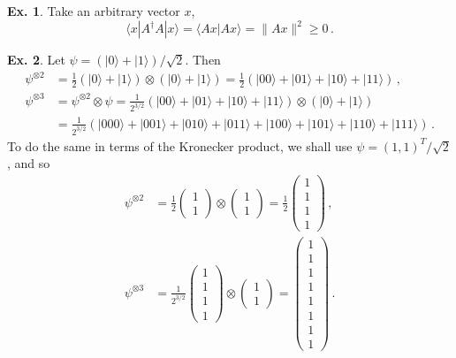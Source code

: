 \documentclass[a4paper,12pt]{article}
\theoremstyle{definition}
\newtheorem{exercise}{Ex.}[section]
\begin{document}
\begin{exercise} Take an arbitrary vector $x$,
 \[
  \langle x | A^\dagger A | x \rangle = \langle A x|A x\rangle = \|A x\|^2 \ge 0\,.
 \]
\end{exercise}

\begin{exercise}
 Let $\psi=(|0\rangle + |1\rangle)/\sqrt{2}$. Then
 \[
  \begin{aligned}
   \psi^{\otimes 2} &= \frac{1}{2}(|0\rangle+|1\rangle)\otimes (|0\rangle+|1\rangle) = \frac{1}{2}(|00\rangle + |01\rangle + |10\rangle+|11\rangle)\,,\\
   \psi^{\otimes 3} &= \psi^{\otimes2}\otimes\psi = \frac{1}{2^{3/2}}(|00\rangle + |01\rangle + |10\rangle+|11\rangle)\otimes (|0\rangle+|1\rangle)\\
   &= \frac{1}{2^{3/2}}(|000\rangle + |001\rangle + |010\rangle + |011\rangle + |100\rangle + |101\rangle + |110\rangle + |111\rangle)\,.
  \end{aligned}
 \]
 To do the same in terms of the Kronecker product, we shall use $\psi=(1, 1)^T/\sqrt{2}$, and so
 \[
  \begin{aligned}
   \psi^{\otimes 2} &= \frac{1}{2}\begin{pmatrix} 1 \\ 1\end{pmatrix}\otimes\begin{pmatrix} 1 \\ 1\end{pmatrix} = \frac{1}{2}\begin{pmatrix} 1 \\ 1 \\ 1 \\ 1\end{pmatrix}\,,\\
   \psi^{\otimes 3} &= \frac{1}{2^{3/2}} \begin{pmatrix} 1 \\ 1 \\ 1 \\ 1\end{pmatrix} \otimes \begin{pmatrix} 1 \\ 1\end{pmatrix} = \begin{pmatrix} 1 \\ 1\\ 1\\ 1\\ 1\\ 1\\ 1\\ 1\end{pmatrix}\,.
  \end{aligned}
 \]
\end{exercise}
\end{document}
